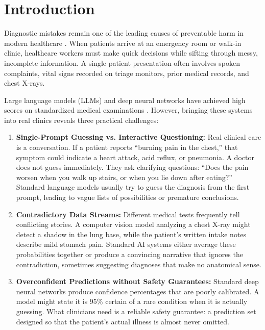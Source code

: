 \documentclass[10pt,twocolumn]{article}
\begin{document}
\section{Introduction}

Diagnostic mistakes remain one of the leading causes of preventable harm in modern healthcare \cite{johnson2019mimic}. When patients arrive at an emergency room or walk-in clinic, healthcare workers must make quick decisions while sifting through messy, incomplete information. A single patient presentation often involves spoken complaints, vital signs recorded on triage monitors, prior medical records, and chest X-rays.

Large language models (LLMs) and deep neural networks have achieved high scores on standardized medical examinations \cite{devlin2019bert, lee2020biobert}. However, bringing these systems into real clinics reveals three practical challenges:

\begin{enumerate}
    \item \textbf{Single-Prompt Guessing vs. Interactive Questioning:} Real clinical care is a conversation. If a patient reports ``burning pain in the chest,'' that symptom could indicate a heart attack, acid reflux, or pneumonia. A doctor does not guess immediately. They ask clarifying questions: ``Does the pain worsen when you walk up stairs, or when you lie down after eating?'' Standard language models usually try to guess the diagnosis from the first prompt, leading to vague lists of possibilities or premature conclusions.
    \item \textbf{Contradictory Data Streams:} Different medical tests frequently tell conflicting stories. A computer vision model analyzing a chest X-ray might detect a shadow in the lung base, while the patient's written intake notes describe mild stomach pain. Standard AI systems either average these probabilities together or produce a convincing narrative that ignores the contradiction, sometimes suggesting diagnoses that make no anatomical sense.
    \item \textbf{Overconfident Predictions without Safety Guarantees:} Standard deep neural networks produce confidence percentages that are poorly calibrated. A model might state it is $95\%$ certain of a rare condition when it is actually guessing. What clinicians need is a reliable safety guarantee: a prediction set designed so that the patient's actual illness is almost never omitted.
\end{enumerate}
\end{document}
